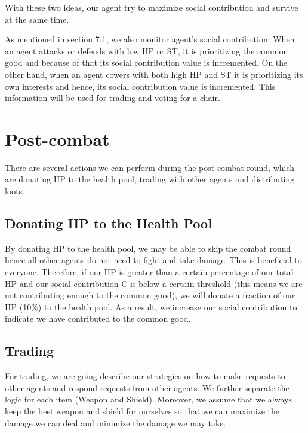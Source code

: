 \par With these two ideas, our agent try to maximize social contribution and survive at the same time.

\par As mentioned in section 7.1, we also monitor agent's social contribution. When an agent attacks or defends with low HP or ST, it is prioritizing the common good and because of that its social contribution value is incremented. On the other hand, when an agent cowers with both high HP and ST it is prioritizing its own interests and hence, its social contribution value is incremented. This information will be used for trading and voting for a chair.

\section{Post-combat}

\par There are several actions we can perform during the post-combat round, which are donating HP to the health pool, trading with other agents and distributing loots.

\subsection{Donating HP to the Health Pool}

\par By donating HP to the health pool, we may be able to skip the combat round hence all other agents do not need to fight and take damage. This is beneficial to everyone. Therefore, if our HP is greater than a certain percentage of our total HP and our social contribution C is below a certain threshold (this means we are not contributing enough to the common good), we will donate a fraction of our HP (10\%) to the health pool. As a result, we increase our social contribution to indicate we have contributed to the common good. 

\subsection{Trading}

\par For trading, we are going describe our strategies on how to make requests to other agents and respond requests from other agents. We further separate the logic for each item (Weapon and Shield). Moreover, we assume that we always keep the best weapon and shield for ourselves so that we can maximize the damage we can deal and minimize the damage we may take. 


